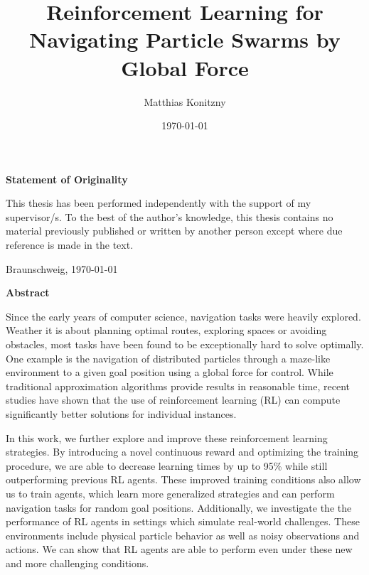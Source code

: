\documentclass[%
  a4paper,%
  11pt,%
  style=print,
  blue,%
  bibliography=totoc,
  nexus,
  lnum,
  extramargin,
  table
  ]{tubsbook}
\title{Reinforcement Learning for Navigating Particle Swarms by Global Force}
\author{Matthias Konitzny}
\date{\today}
\begin{document}
\maketitle

\frontmatter

\cleardoublepage


\thispagestyle{plain} %
\vspace*{7cm}
\centerline{\bfseries Statement of Originality}
\vspace*{1em}
\noindent
This thesis has been performed independently with the support of my supervisor/s.
To the best of the author's knowledge, this thesis contains no material previously
published or written by another person except where due reference is made in the text.

\par
  \bigskip\noindent Braunschweig, \today \par
  \vspace*{10mm}
  \hfill\hrulefill
\cleardoublepage

\thispagestyle{plain} %
\centerline{\bfseries Abstract}
\vspace*{1em}
\noindent
Since the early years of computer science, navigation tasks were heavily explored. Weather it is about planning optimal routes, exploring spaces or avoiding obstacles, most tasks have been found to be exceptionally hard to solve optimally. One example is the navigation of distributed particles through a maze-like environment to a given goal position using a global force for control. While traditional approximation algorithms provide results in reasonable time, recent studies have shown that the use of reinforcement learning (RL) can compute significantly better solutions for individual instances.

In this work, we further explore and improve these reinforcement learning strategies. By introducing a novel continuous reward and optimizing the training procedure, we are able to decrease learning times by up to 95\% while still outperforming previous RL agents. These improved training conditions also allow us to train agents, which learn more generalized strategies and can perform navigation tasks for random goal positions. Additionally, we investigate the the performance of RL agents in settings which simulate real-world challenges. These environments include physical particle behavior as well as noisy observations and actions. We can show that RL agents are able to perform even under these new and more challenging conditions.  
\end{document}
